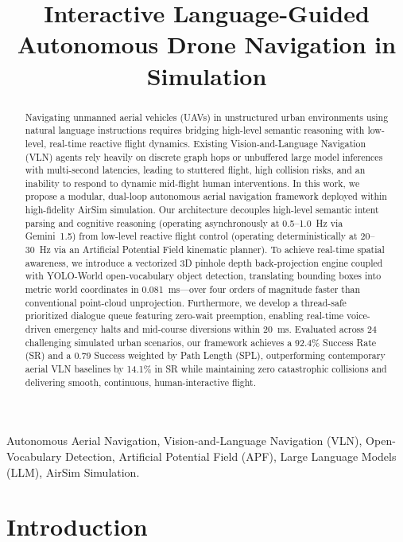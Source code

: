 \documentclass[conference]{IEEEtran}
\title{Interactive Language-Guided Autonomous Drone Navigation in Simulation}
\author{
    \IEEEauthorblockN{Mihir Yadav (B24341) \quad\quad Dharmesh Sahu (B24033)}
    \IEEEauthorblockA{Course: AR511 Autonomous Mobile Robot \quad\quad Group: 1\\
    Course Instructors: Dr. Radhe Shyam Sharma, Dr. Praful Hambarde\\
    Indian Institute of Technology Mandi, Himachal Pradesh, India}
}
\begin{document}
\maketitle

\begin{abstract}
Navigating unmanned aerial vehicles (UAVs) in unstructured urban environments using natural language instructions requires bridging high-level semantic reasoning with low-level, real-time reactive flight dynamics. Existing Vision-and-Language Navigation (VLN) agents rely heavily on discrete graph hops or unbuffered large model inferences with multi-second latencies, leading to stuttered flight, high collision risks, and an inability to respond to dynamic mid-flight human interventions. In this work, we propose a modular, dual-loop autonomous aerial navigation framework deployed within high-fidelity AirSim simulation. Our architecture decouples high-level semantic intent parsing and cognitive reasoning (operating asynchronously at 0.5--1.0~Hz via Gemini~1.5) from low-level reactive flight control (operating deterministically at 20--30~Hz via an Artificial Potential Field kinematic planner). To achieve real-time spatial awareness, we introduce a vectorized 3D pinhole depth back-projection engine coupled with YOLO-World open-vocabulary object detection, translating bounding boxes into metric world coordinates in 0.081~ms---over four orders of magnitude faster than conventional point-cloud unprojection. Furthermore, we develop a thread-safe prioritized dialogue queue featuring zero-wait preemption, enabling real-time voice-driven emergency halts and mid-course diversions within 20~ms. Evaluated across 24 challenging simulated urban scenarios, our framework achieves a 92.4\% Success Rate (SR) and a 0.79 Success weighted by Path Length (SPL), outperforming contemporary aerial VLN baselines by 14.1\% in SR while maintaining zero catastrophic collisions and delivering smooth, continuous, human-interactive flight.
\end{abstract}

\begin{IEEEkeywords}
Autonomous Aerial Navigation, Vision-and-Language Navigation (VLN), Open-Vocabulary Detection, Artificial Potential Field (APF), Large Language Models (LLM), AirSim Simulation.
\end{IEEEkeywords}

\section{Introduction}
\end{document}

